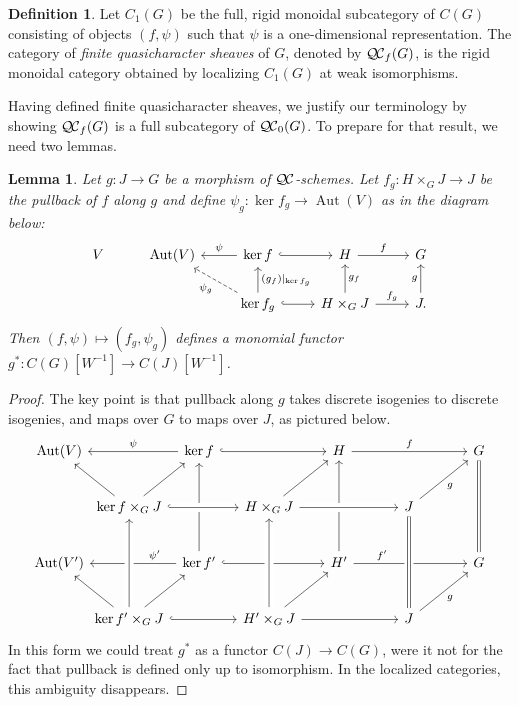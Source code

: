 \documentclass{amsart}
\theoremstyle{plain}
\newtheorem{lemma}[theorem]{Lemma}
\theoremstyle{definition}
\newtheorem{definition}[theorem]{Definition}
\theoremstyle{remark}
\DeclareMathOperator{\Aut}{Aut}
\newcommand{\QC}{{\mathcal{Q\hskip-0.8pt C}}}
\newcommand{\QCb}{{\QC_0}}
\newcommand{\QCf}{{\QC_f}}
\begin{document}
\begin{definition}
Let $C_1(G)$ be the full, rigid monoidal subcategory of $C(G)$ consisting of objects
$(f,\psi)$ such that $\psi$ is a one-dimensional representation.
The category of \emph{finite quasicharacter sheaves} of $G$, denoted by $\QCf(G)$,
is the rigid monoidal category obtained by localizing $C_1(G)$ at weak isomorphisms.
\end{definition}

Having defined finite quasicharacter sheaves, 
we justify our terminology by showing $\QCf(G)$ is a full subcategory of $\QCb(G)$.
To prepare for that result, we need two lemmas.

\begin{lemma}\label{lemma:finite-pullback}
Let $g : J \to G$ be a morphism of $\QC$-schemes. 
Let $f_g : H\times_G J\to J$
be the pullback of $f$ along $g$ and define $\psi_g : \ker f_g \to \Aut(V)$ as in the diagram below:
\[
\begin{tikzcd}
V & \Aut(V) & \arrow[swap]{l}{\psi} \ker f \arrow[hook]{r} & H \arrow{r}{f} &  G\\
  &  & \arrow[dashed]{ul}{\psi_g} \arrow[swap]{u}{(g_f)\vert_{\ker f_g}} \ker f_g \arrow[hook]{r}
  & \arrow[swap]{u}{g_f} H\times_G J \arrow{r}{f_g} & \arrow{u}{g} J.
\end{tikzcd}
\]
Then $(f,\psi) \mapsto (f_g,\psi_g)$
defines a monomial functor $g^* : C(G)[W^{-1}] \to C(J)[W^{-1}]$.
\end{lemma}

\begin{proof}
The key point is that pullback along $g$ takes discrete isogenies to discrete isogenies,
and maps over $G$ to maps over $J$, as pictured below.
\[
\begin{tikzcd}[row sep={{{{40,between origins}}}},column sep={{{{50,between origins}}}}]
\Aut(V) && \arrow[swap]{ll}{\psi} \ker f \arrow[hook]{rr} \arrow[leftarrow]{dd} && H \arrow{rr}{f} \arrow[leftarrow]{dd} && \arrow[equal]{dd} G\\
& \arrow{ul} \ker f\times_G J \arrow{ur} \arrow[hook, crossing over]{rr} && H\times_G J \arrow{ur} \arrow[crossing over]{rr} && J \arrow[swap]{ur}{g} & \\
 \Aut(V') && \arrow[swap,pos=0.25]{ll}{\psi'} \ker f'  \arrow[hook]{rr}
&& H' \arrow[pos=0.25]{rr}{f'} && G\\
 & \arrow{ul} \ker f'\times_G J \arrow[crossing over]{uu} \arrow{ur} \arrow[hook]{rr}
 && \arrow[crossing over]{uu} H'\times_G J \arrow{ur} \arrow{rr} && \arrow[equals, crossing over]{uu} J \arrow[swap]{ur}{g} & 
\end{tikzcd}
\]
In this form we could treat $g^*$ as a functor $C(J)\to C(G)$,
were it not for the fact that pullback is defined only up to isomorphism.
In the localized categories, this ambiguity disappears. 
\end{proof}
\end{document}
